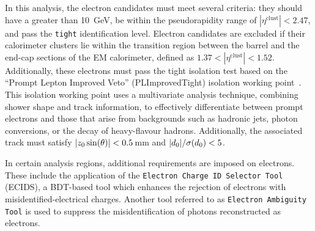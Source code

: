 In this analysis, the electron candidates must meet several criteria: 
they should have a \pT greater than 10~GeV, be within the pseudorapidity range of $|\eta^\mathrm{clust}| < 2.47$, 
and pass the \texttt{tight} identification level.  
Electron candidates are excluded if their calorimeter clusters lie within the transition region 
between the barrel and the end-cap sections of the EM calorimeter, defined as 
$1.37 < |\eta^\mathrm{clust}| < 1.52$. 
Additionally, these electrons must pass the tight isolation test based on the ``Prompt Lepton Improved Veto'' 
(PLImprovedTight) isolation working point~\cite{ATLAS:2022swp}.
 This isolation working point uses a multivariate analysis technique, combining shower shape and 
 track information, to effectively differentiate between prompt electrons and those that arise from 
 backgrounds such as hadronic jets, photon conversions, or the decay of heavy-flavour hadrons.
Additionally, the associated track must satisfy  $|z_{0} \sin(\theta)| < 0.5\,$mm 
and $|d_{0}| / \sigma(d_{0}) < 5$. %

In certain analysis regions, additional requirements are imposed on electrons. 
These include the application of 
the \texttt{Electron Charge ID Selector Tool} (ECIDS),
a BDT-based tool which enhances the rejection of electrons 
with misidentified-electrical charges. Another tool referred to as
\texttt{Electron Ambiguity Tool} is used to suppress the misidentification of 
photons reconstructed as electrons.

